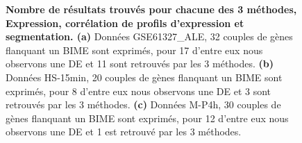 \documentclass[12pt,a4paper]{report}
\begin{document}
\begin{figure}[h!]
\caption{\textbf{Nombre de résultats trouvés pour chacune des 3 méthodes, Expression, corrélation de profils d'expression et segmentation. (a)} Données GSE61327\_ALE, 32 couples de gènes flanquant un BIME sont exprimés, pour 17 d'entre eux nous observons une DE et 11 sont retrouvés par les 3 méthodes. \textbf{(b)} Données HS-15min, 20 couples de gènes flanquant un BIME sont exprimés, pour 8 d'entre eux nous observons une DE et 3 sont retrouvés par les 3 méthodes. \textbf{(c)} Données M-P4h, 30 couples de gènes flanquant un BIME sont exprimés, pour 12 d'entre eux nous observons une DE et 1 est retrouvé par les 3 méthodes.} 
\end{figure}
\end{document}
